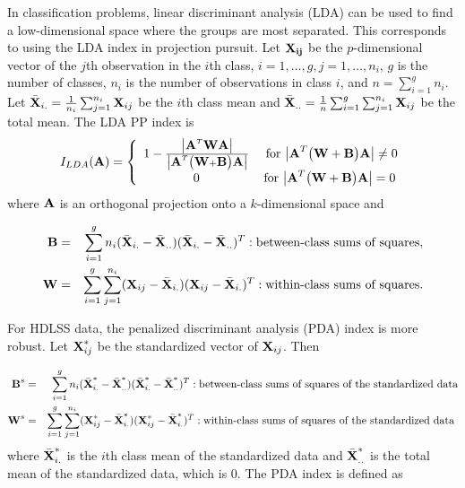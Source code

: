 In classification problems, linear discriminant analysis (LDA) can be used to find a low-dimensional space where the groups are most separated. This corresponds to using the LDA index \citep{lee:2009} in projection pursuit. Let $\bf{X_{ij}}$ be the $p$-dimensional vector of the $j$th observation in the $i$th class, $i = 1, \dots, g, j = 1, \dots, n_i$, $g$ is the number of classes, $n_i$ is the number of observations in class $i$, and $n = \sum_{i = 1}^g n_i$. Let $\bar{\mbox{\boldmath {\bf X}}}_{i.} = \frac{1}{n_i} \sum_{j=1}^{n_i} \mbox{\boldmath {\bf X}}_{ij}$
be the $i$th class mean and $\bar{\mbox{\boldmath {\bf X}}}_{..} =
\frac{1}{n}\sum_{i=1}^g \sum_{j=1}^{n_i} \mbox{\boldmath {\bf X}}_{ij}$ be the total
mean. The LDA PP index is
\begin{equation}
I_{LDA} ({\mbox{\boldmath {\bf A}}}) = \left \{ \begin{array}{cc}
                       1-\frac{\big|{\mbox{\boldmath {\bf A}}}^T\mbox{\boldmath {\bf W}}{\mbox{\boldmath {\bf A}}}\big|}{\big|{\mbox{\boldmath {\bf A}}}^T\big
                                  (\mbox{\boldmath {\bf W}} + \mbox{\boldmath {\bf B}}\big){\mbox{\boldmath {\bf A}}}\big|} &
                       \mbox{ for $\big|{\mbox{\boldmath {\bf A}}}^T\big(\mbox{\boldmath {\bf W}} + \mbox{\boldmath {\bf B}}\big) {\mbox{\boldmath {\bf A}}}\big| \ne 0$}\\
                       0 & \mbox{for  $\big|{\mbox{\boldmath {\bf A}}}^T\big(\mbox{\boldmath {\bf W}} + \mbox{\boldmath {\bf B}}\big) {\mbox{\boldmath {\bf A}}}\big| = 0$}
                       \end{array}
               \right.
\end{equation}
where $\mbox{\boldmath {\bf A}}$ is an orthogonal projection onto a $k$-dimensional space and

\begin{eqnarray}
 \mbox{\boldmath {\bf B}}&=&\sum_{i=1}^g n_i (\bar{\mbox{\boldmath {\bf X}}}_{i.} - \bar{\mbox{\boldmath {\bf X}}}_{..})(\bar{\mbox{\boldmath {\bf X}}}_{i.}
  - \bar{\mbox{\boldmath {\bf X}}}_{..})^T
:  \mbox{between-class sums of squares}, \nonumber\\
\mbox{\boldmath {\bf W}}&=&\sum_{i=1}^g \sum_{j=1}^{n_i} (\mbox{\boldmath {\bf X}}_{ij} -
\bar{\mbox{\boldmath {\bf X}}}_{i.})(\mbox{\boldmath {\bf X}}_{ij} - \bar{\mbox{\boldmath {\bf X}}}_{i.})^T :
\mbox{within-class sums of squares}.\nonumber
\end{eqnarray}

For HDLSS data, the penalized discriminant analysis (PDA) index \citep{lee:2009} is more robust. Let ${\mbox{\boldmath {\bf X}}}_{ij}^*$ be the standardized vector of ${\mbox{\boldmath {\bf X}}}_{ij}$. Then 

\begin{eqnarray}
 \mbox{\boldmath {\bf B}}^s&=&\sum_{i=1}^g n_i (\bar{\mbox{\boldmath {\bf X}}}^*_{i.} - \bar{\mbox{\boldmath {\bf X}}}^*_{..})(\bar{\mbox{\boldmath {\bf X}}}^*_{i.}
  - \bar{\mbox{\boldmath {\bf X}}}^*_{..})^T: \hbox{between-class sums of squares of the standardized data}\nonumber\\
\mbox{\boldmath {\bf W}}^s&=&\sum_{i=1}^g \sum_{j=1}^{n_i} (\mbox{\boldmath {\bf X}}^*_{ij} -
\bar{\mbox{\boldmath {\bf X}}}^*_{i.})(\mbox{\boldmath {\bf X}}^*_{ij} - \bar{\mbox{\boldmath {\bf X}}}^*_{i.})^T: \hbox{within-class sums of squares of the standardized data }\nonumber
\end{eqnarray}
where $\bar{\mbox{\boldmath {\bf X}}}^*_{i.}$ is the $i$th class mean of the standardized data and $\bar{\mbox{\boldmath {\bf X}}}^*_{..}$ is the
total mean of the standardized data, which is 0. The PDA index is defined as


